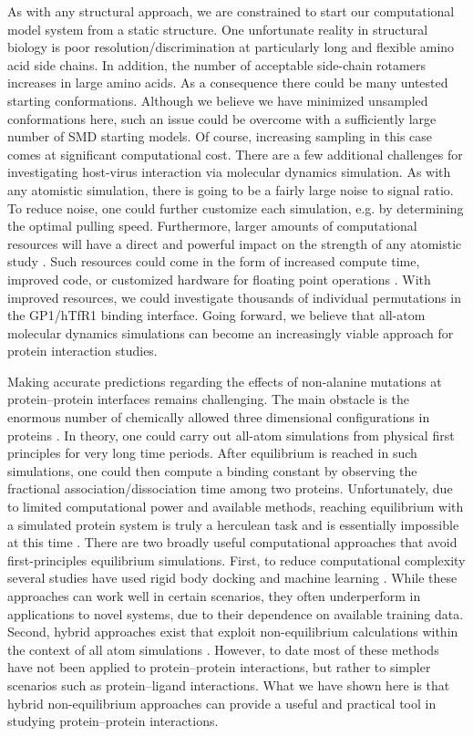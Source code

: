 \documentclass[12pt]{article}
\begin{document}
As with any structural approach, we are constrained to start our computational model system from a static structure. One unfortunate reality in structural biology is poor resolution/discrimination at particularly long and flexible amino acid side chains. In addition, the number of acceptable side-chain rotamers increases in large amino acids. As a consequence there could be many untested starting conformations. Although we believe we have minimized unsampled conformations here, such an issue could be overcome with a sufficiently large number of SMD starting models. Of course, increasing sampling in this case comes at significant computational cost. There are a few additional challenges for investigating host-virus interaction via molecular dynamics simulation. As with any atomistic simulation, there is going to be a fairly large noise to signal ratio. To reduce noise, one could further customize each simulation, e.g. by determining the optimal pulling speed. Furthermore, larger amounts of computational resources will have a direct and powerful impact on the strength of any atomistic study \citep{Shaw2012}. Such resources could come in the form of increased compute time, improved code, or customized hardware for floating point operations \citep{Shaw2011}. With improved resources, we could investigate thousands of individual permutations in the GP1/hTfR1 binding interface. Going forward, we believe that all-atom molecular dynamics simulations can become an increasingly viable approach for protein interaction studies. 

Making accurate predictions regarding the effects of non-alanine mutations at protein--protein interfaces remains  challenging. The main obstacle is the enormous number of chemically allowed three dimensional configurations in proteins \citep{Gumbart2012}. In theory, one could carry out all-atom simulations from physical first principles \citep{Gumbart2012} for very long time periods. After equilibrium is reached in such simulations, one could then compute a binding constant by observing the fractional association/dissociation time among two proteins. Unfortunately, due to limited computational power and available methods, reaching equilibrium with a simulated protein system is truly a herculean task and is essentially impossible at this time \citep{Gumbart2012}. There are two broadly useful computational approaches that avoid first-principles equilibrium simulations. First, to reduce computational complexity several studies have used rigid body docking and machine learning \citep{Vreven2011,Vreven2012,Bajaj2011,Hwang2010}. While these approaches can work well in certain scenarios, they often underperform in applications to novel systems, due to their dependence on available training data. Second, hybrid approaches exist that exploit non-equilibrium calculations within the context of all atom simulations \citep{Dixit2001,Is2001A,Is2001B,Park2004,Grant2011,Kortemme2004,Gumbart2012}. However, to date most of these methods have not been applied to protein--protein interactions, but rather to simpler scenarios such as protein--ligand interactions. What we have shown here is that hybrid non-equilibrium approaches can provide a useful and practical tool in studying protein--protein interactions.
\end{document}
